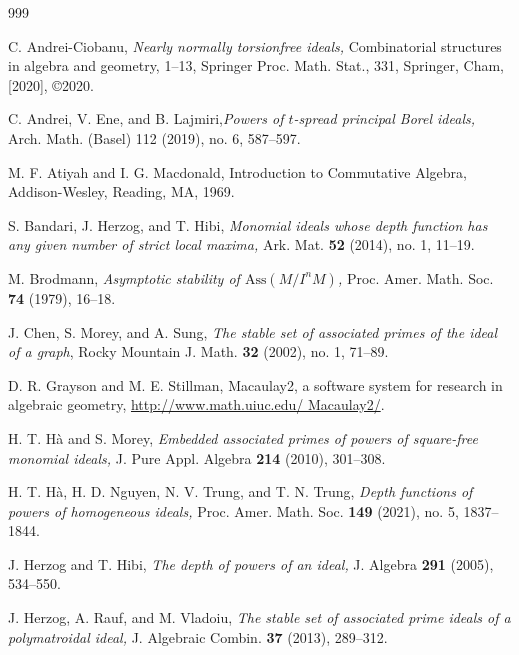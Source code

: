 \documentclass[11pt]{amsart}
\begin{document}



\begin{thebibliography}{999}

  C. Andrei-Ciobanu, {\it  Nearly normally torsionfree ideals,}  Combinatorial structures in algebra and geometry, 1--13, Springer Proc. Math. Stat., 331, Springer, Cham, [2020], ©2020.

 C. Andrei, V.  Ene, and B.  Lajmiri,{\it Powers of $t$-spread principal Borel ideals,}  Arch. Math. (Basel) 112 (2019), no. 6, 587--597. 
  
  M. F. Atiyah and I. G. Macdonald, {Introduction to Commutative Algebra}, Addison-Wesley, Reading, MA, 1969.
 
 
  S. Bandari, J. Herzog, and T.  Hibi, \textit{Monomial ideals whose depth function has any given number of strict local maxima,}
 Ark. Mat. \textbf{52} (2014), no. 1, 11--19.
 
 
   M. Brodmann, {\it Asymptotic stability of $\mathrm{Ass}(M/I^{n}M)$,}  Proc. Amer. Math. Soc. {\bf 74} (1979),  16--18.


  J. Chen, S. Morey, and A. Sung, {\it  The stable set of associated primes of the ideal of a graph},
 Rocky Mountain J. Math. {\bf 32} (2002), no. 1, 71--89.

 

     D. R. Grayson and  M. E. Stillman, Macaulay2, a software system for research in algebraic geometry,  
\url{http://www.math.uiuc.edu/ Macaulay2/}.


   H. T. H\`a  and  S. Morey, {\it Embedded associated primes of powers of square-free monomial ideals,} J. Pure Appl. Algebra
 {\bf 214} (2010), 301--308.
 
 H. T. H\`a, H. D.  Nguyen, N. V.  Trung, and T. N.  Trung, \textit{Depth functions of powers of homogeneous ideals,} 
 Proc. Amer. Math. Soc. \textbf{149} (2021), no. 5, 1837--1844. 

   J. Herzog and  T. Hibi,  {\it The depth of powers of  an ideal,} J. Algebra {\bf 291} (2005),  534--550.


  J. Herzog, A. Rauf, and M. Vladoiu, {\it The stable set of associated prime ideals of a polymatroidal ideal,}  J. Algebraic Combin. {\bf 37} (2013),  289--312.



\end{thebibliography}
\end{document}
